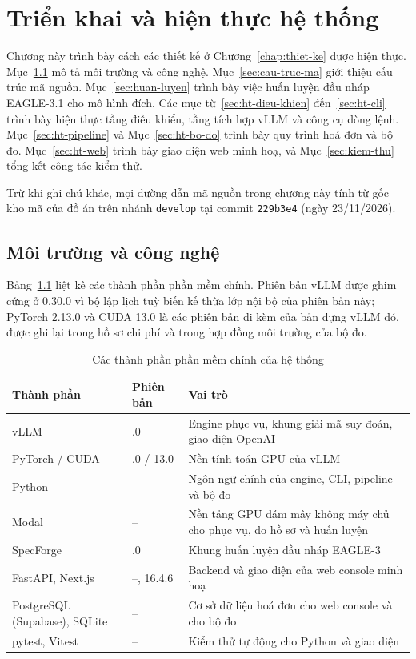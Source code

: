 \chapter{Triển khai và hiện thực hệ thống}
\label{chap:trien-khai}

Chương này trình bày cách các thiết kế ở Chương~\ref{chap:thiet-ke} được hiện thực. Mục~\ref{sec:moi-truong} mô tả môi trường và công nghệ. Mục~\ref{sec:cau-truc-ma} giới thiệu cấu trúc mã nguồn. Mục~\ref{sec:huan-luyen} trình bày việc huấn luyện đầu nháp EAGLE-3.1 cho mô hình đích. Các mục từ~\ref{sec:ht-dieu-khien} đến~\ref{sec:ht-cli} trình bày hiện thực tầng điều khiển, tầng tích hợp vLLM và công cụ dòng lệnh. Mục~\ref{sec:ht-pipeline} và Mục~\ref{sec:ht-bo-do} trình bày quy trình hoá đơn và bộ đo. Mục~\ref{sec:ht-web} trình bày giao diện web minh hoạ, và Mục~\ref{sec:kiem-thu} tổng kết công tác kiểm thử.

Trừ khi ghi chú khác, mọi đường dẫn mã nguồn trong chương này tính từ gốc kho mã của đồ án trên nhánh \texttt{develop} tại commit \texttt{229b3e4} (ngày 23/11/2026).

\section{Môi trường và công nghệ}
\label{sec:moi-truong}

Bảng~\ref{tab:cong-nghe} liệt kê các thành phần phần mềm chính. Phiên bản vLLM được ghim cứng ở 0.30.0 vì bộ lập lịch tuỳ biến kế thừa lớp nội bộ của phiên bản này; PyTorch 2.13.0 và CUDA 13.0 là các phiên bản đi kèm của bản dựng vLLM đó, được ghi lại trong hồ sơ chi phí và trong hợp đồng môi trường của bộ đo.

\begin{table}[htbp]
\centering
\caption{Các thành phần phần mềm chính của hệ thống}
\label{tab:cong-nghe}
\small
\begin{tabularx}{\linewidth}{@{}>{\raggedright\arraybackslash}p{36mm}>{\raggedright\arraybackslash}p{28mm}>{\raggedright\arraybackslash}X@{}}
\toprule
\textbf{Thành phần} & \textbf{Phiên bản} & \textbf{Vai trò} \\
\midrule
vLLM & 0.30.0 & Engine phục vụ, khung giải mã suy đoán, giao diện OpenAI \\
PyTorch / CUDA & 2.13.0 / 13.0 & Nền tính toán GPU của vLLM \\
Python & 3.11 & Ngôn ngữ chính của engine, CLI, pipeline và bộ đo \\
Modal & -- & Nền tảng GPU đám mây không máy chủ cho phục vụ, đo hồ sơ và huấn luyện \\
SpecForge & 0.2.0 & Khung huấn luyện đầu nháp EAGLE-3 \\
FastAPI, Next.js & --, 16.4.6 & Backend và giao diện của web console minh hoạ \\
PostgreSQL (Supabase), SQLite & -- & Cơ sở dữ liệu hoá đơn cho web console và cho bộ đo \\
pytest, Vitest & -- & Kiểm thử tự động cho Python và giao diện \\
\bottomrule
\end{tabularx}
\end{table}

